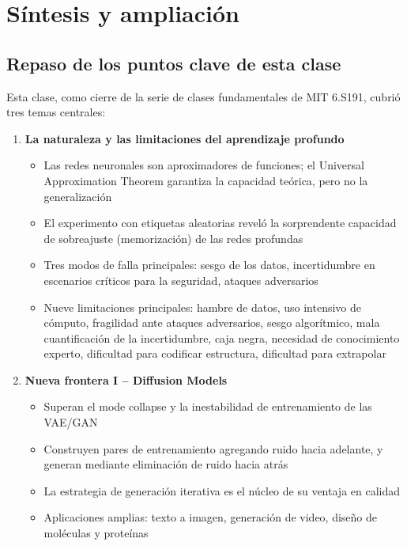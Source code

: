 \section{Síntesis y ampliación}

\subsection{Repaso de los puntos clave de esta clase}

Esta clase, como cierre de la serie de clases fundamentales de MIT 6.S191, cubrió tres temas centrales:

\begin{enumerate}
    \item \textbf{La naturaleza y las limitaciones del aprendizaje profundo}
    \begin{itemize}
        \item Las redes neuronales son aproximadores de funciones; el Universal Approximation Theorem garantiza la capacidad teórica, pero no la generalización
        \item El experimento con etiquetas aleatorias reveló la sorprendente capacidad de sobreajuste (memorización) de las redes profundas
        \item Tres modos de falla principales: sesgo de los datos, incertidumbre en escenarios críticos para la seguridad, ataques adversarios
        \item Nueve limitaciones principales: hambre de datos, uso intensivo de cómputo, fragilidad ante ataques adversarios, sesgo algorítmico, mala cuantificación de la incertidumbre, caja negra, necesidad de conocimiento experto, dificultad para codificar estructura, dificultad para extrapolar
    \end{itemize}

    \item \textbf{Nueva frontera I -- Diffusion Models}
    \begin{itemize}
        \item Superan el mode collapse y la inestabilidad de entrenamiento de las VAE/GAN
        \item Construyen pares de entrenamiento agregando ruido hacia adelante, y generan mediante eliminación de ruido hacia atrás
        \item La estrategia de generación iterativa es el núcleo de su ventaja en calidad
        \item Aplicaciones amplias: texto a imagen, generación de video, diseño de moléculas y proteínas
    \end{itemize}


\end{enumerate}
